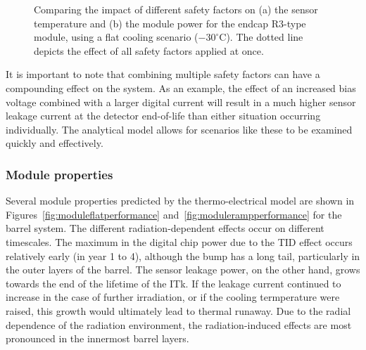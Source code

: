 \begin{figure}[ht]
\centering
{}\quad\quad
{}
\caption{Comparing the impact of different safety factors on (a) the sensor temperature and
(b) the module power for the endcap R3-type module, using a flat cooling scenario ($-30^\circ$C). The dotted line depicts the effect of all safety
factors applied at once.}
\label{fig:safety_factors}
\end{figure}

It is important to note that combining multiple safety factors can have a compounding effect on the system. As an example, the effect of an increased bias voltage combined with a larger digital current will result in a much higher sensor leakage current at the detector end-of-life than either situation occurring individually. The analytical model allows for scenarios like these to be examined quickly and effectively.

\subsubsection{Module properties}

Several module properties predicted by the thermo-electrical model are shown in Figures~\ref{fig:moduleflatperformance} and~\ref{fig:modulerampperformance} for the barrel system. The different radiation-dependent effects occur on different timescales. The maximum in the digital chip power due to the TID effect occurs relatively early (in year 1 to 4), although the bump has a long tail, particularly in the outer layers of the barrel. The sensor leakage power, on the other hand, grows towards the end of the lifetime of the ITk. If the leakage current continued to increase in the case of further irradiation, or if the cooling termperature were raised, this growth would ultimately lead to thermal runaway. Due to the radial dependence of the radiation environment, the radiation-induced effects are most pronounced in the innermost barrel layers.

